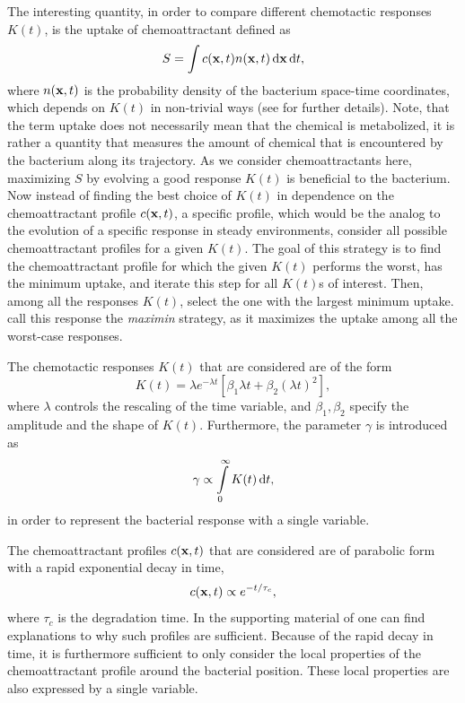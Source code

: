 The interesting quantity, in order to compare different chemotactic responses $K(t)$, is the uptake of chemoattractant defined as
\begin{equation}
 S = \int c(\mathbf{x}, t) n(\mathbf{x}, t) \mathop{}\!\mathrm{d} \mathbf{x} \mathop{}\!\mathrm{d} t,
\end{equation}
where $n(\mathbf{x}, t)$ is the probability density of the bacterium space-time coordinates, which depends on $K(t)$ in non-trivial ways (see \cite{celani:2010} for further details). Note, that the term uptake does not necessarily mean that the chemical is metabolized, it is rather a quantity that measures the amount of chemical that is encountered by the bacterium along its trajectory. As we consider chemoattractants here, maximizing $S$ by evolving a good response $K(t)$ is beneficial to the bacterium. Now instead of finding the best choice of $K(t)$ in dependence on the chemoattractant profile $c(\mathbf{x}, t)$, \ie a specific profile, which would be the analog to the evolution of a specific response in steady environments, \citeauthor{celani:2010} consider all possible chemoattractant profiles for a given $K(t)$. The goal of this strategy is to find the chemoattractant profile for which the given $K(t)$ performs the worst, \ie has the minimum uptake, and iterate this step for all $K(t)$s of interest. Then, among all the responses $K(t)$, select the one with the largest minimum uptake. \citeauthor{celani:2010} call this response the \textit{maximin} strategy, as it maximizes the uptake among all the worst-case responses.

The chemotactic responses $K(t)$ that are considered are of the form
\begin{equation}
 K(t) = \lambda e^{-\lambda t} \left[\beta_1 \lambda t + \beta_2 (\lambda t)^2\right],
\end{equation}
where $\lambda$ controls the rescaling of the time variable, and $\beta_1, \beta_2$ specify the amplitude and the shape of $K(t)$. Furthermore, the parameter $\gamma$ is introduced as
\begin{equation}
 \gamma \propto \int\limits_0^\infty K(t) \mathop{}\!\mathrm{d} t,
\end{equation}
in order to represent the bacterial response with a single variable.

The chemoattractant profiles $c(\mathbf{x},t)$ that are considered are of parabolic form with a rapid exponential decay in time, \ie
\begin{equation}
 c(\mathbf{x},t) \propto e^{-t / \tau_c},
\end{equation}
where $\tau_c$ is the degradation time. In the supporting material of \cite{celani:2010} one can find explanations to why such profiles are sufficient. Because of the rapid decay in time, it is furthermore sufficient to only consider the local properties of the chemoattractant profile around the bacterial position. These local properties are also expressed by a single variable.

